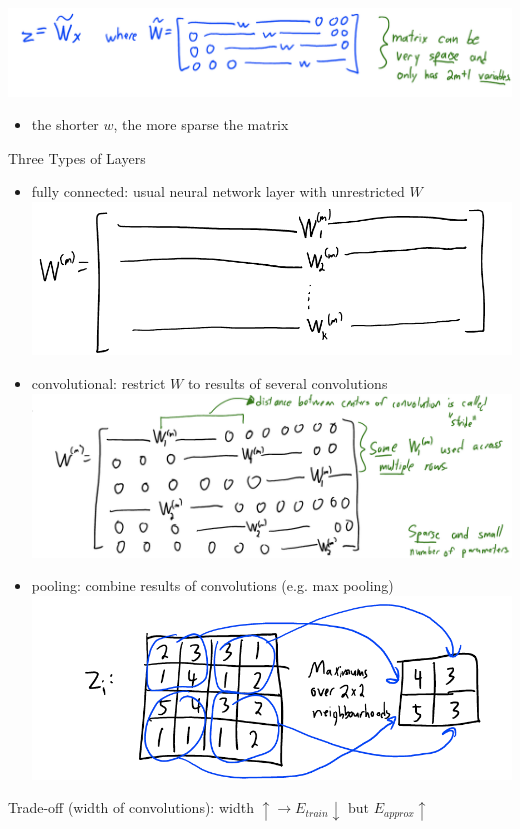 \documentclass[10pt,landscape,a4paper]{article}
\begin{document}
\begin{multicols*}{5}
\includegraphics[scale=0.12]{convolution_as_matrix_multiplication}
\begin{itemize}
    \item the shorter \(w\), the more sparse the matrix
\end{itemize}
Three Types of Layers
\begin{itemize}
    \item fully connected: usual neural network layer with unrestricted \(W\) \\
    \includegraphics[scale=0.1]{fully_connected}
    \item convolutional: restrict \(W\) to results of several convolutions \\
    \includegraphics[scale=0.1]{convolutional}
    \item pooling: combine results of convolutions (e.g. max pooling) \\
    \includegraphics[scale=0.1]{max_pooling}
\end{itemize}
Trade-off (width of convolutions): width \(\uparrow \rightarrow E_{train} \downarrow \text{ but } E_{approx} \uparrow\)


\end{multicols*}
\end{document}
